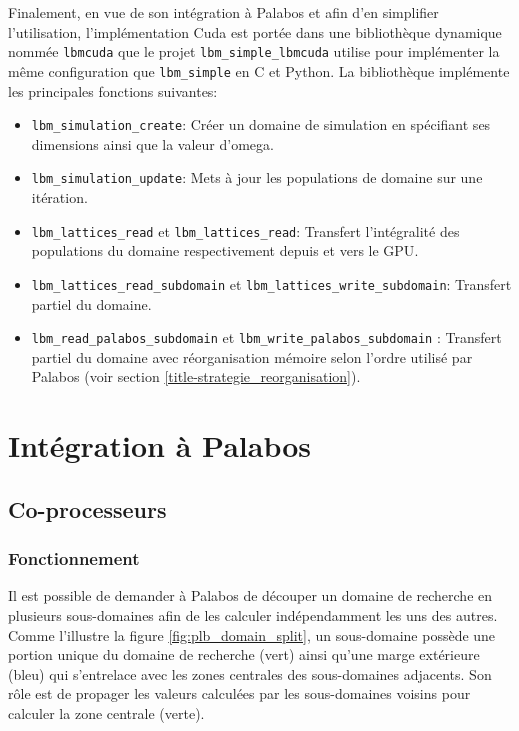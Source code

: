 Finalement, en vue de son intégration à Palabos et afin d'en simplifier l'utilisation, l'implémentation Cuda est portée dans une bibliothèque dynamique nommée \texttt{lbmcuda} que le projet \texttt{lbm\_simple\_lbmcuda} utilise pour implémenter la même configuration que \texttt{lbm\_simple} en C et Python. La bibliothèque implémente les principales fonctions suivantes:

\begin{itemize}
\item \texttt{lbm\_simulation\_create}: Créer un domaine de simulation en spécifiant ses dimensions ainsi que la valeur d'omega.
\item \texttt{lbm\_simulation\_update}: Mets à jour les populations de domaine sur une itération.
\item \texttt{lbm\_lattices\_read} et \texttt{lbm\_lattices\_read}: Transfert l'intégralité des populations du domaine respectivement depuis et vers le \acs{GPU}.
\item \texttt{lbm\_lattices\_read\_subdomain} et \texttt{lbm\_lattices\_write\_subdomain}: Transfert partiel du domaine.
\item \texttt{lbm\_read\_palabos\_subdomain} et \texttt{lbm\_write\_palabos\_subdomain} : Transfert partiel du domaine avec réorganisation mémoire selon l'ordre utilisé par Palabos (voir section \ref{title-strategie_reorganisation}).
\end{itemize}

\section{Intégration à Palabos}
\subsection{Co-processeurs}
\subsubsection{Fonctionnement}
Il est possible de demander à Palabos de découper un domaine de recherche en plusieurs sous-domaines afin de les calculer indépendamment les uns des autres. Comme l'illustre la figure \ref{fig:plb_domain_split}, un sous-domaine possède une portion unique du domaine de recherche (vert) ainsi qu'une marge extérieure (bleu) qui s'entrelace avec les zones centrales des sous-domaines adjacents. Son rôle est de propager les valeurs calculées par les sous-domaines voisins pour calculer la zone centrale (verte).


